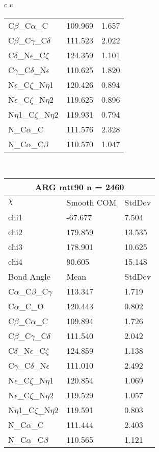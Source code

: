 \begin{longtable}{ c c }
\begin{tabular}{ l l l }
  C$\beta$\_C$\alpha$\_C & 109.969 & 1.657\\
  C$\beta$\_C$\gamma$\_C$\delta$ & 111.523 & 2.022\\
  C$\delta$\_N$\epsilon$\_C$\zeta$ & 124.359 & 1.101\\
  C$\gamma$\_C$\delta$\_N$\epsilon$ & 110.625 & 1.820\\
  N$\epsilon$\_C$\zeta$\_N$\eta$1 & 120.426 & 0.894\\
  N$\epsilon$\_C$\zeta$\_N$\eta$2 & 119.625 & 0.896\\
  N$\eta$1\_C$\zeta$\_N$\eta$2 & 119.931 & 0.794\\
  N\_C$\alpha$\_C & 111.576 & 2.328\\
  N\_C$\alpha$\_C$\beta$ & 110.570 & 1.047\\
  \bottomrule
  \end{tabular}
  \\
  \begin{tabular}{ l l l }
  \toprule
  \multicolumn{3}{c}{ARG \textbf{mtt90} n = 2460} \\ \toprule
  $\chi$       & Smooth COM & StdDev \\ \midrule
  chi1 & -67.677 & 7.504 \\ 
  chi2 & 179.859 & 13.535 \\ 
  chi3 & 178.901 & 10.625 \\ 
  chi4 & 90.605 & 15.148 \\ \midrule
  Bond Angle   & Mean     & StdDev \\ \midrule
  C$\alpha$\_C$\beta$\_C$\gamma$ & 113.347 & 1.719\\
  C$\alpha$\_C\_O & 120.443 & 0.802\\
  C$\beta$\_C$\alpha$\_C & 109.894 & 1.726\\
  C$\beta$\_C$\gamma$\_C$\delta$ & 111.540 & 2.042\\
  C$\delta$\_N$\epsilon$\_C$\zeta$ & 124.859 & 1.138\\
  C$\gamma$\_C$\delta$\_N$\epsilon$ & 111.010 & 2.492\\
  N$\epsilon$\_C$\zeta$\_N$\eta$1 & 120.854 & 1.069\\
  N$\epsilon$\_C$\zeta$\_N$\eta$2 & 119.529 & 1.057\\
  N$\eta$1\_C$\zeta$\_N$\eta$2 & 119.591 & 0.803\\
  N\_C$\alpha$\_C & 111.444 & 2.403\\
  N\_C$\alpha$\_C$\beta$ & 110.565 & 1.121\\
  \bottomrule
  \end{tabular}

\end{longtable}
